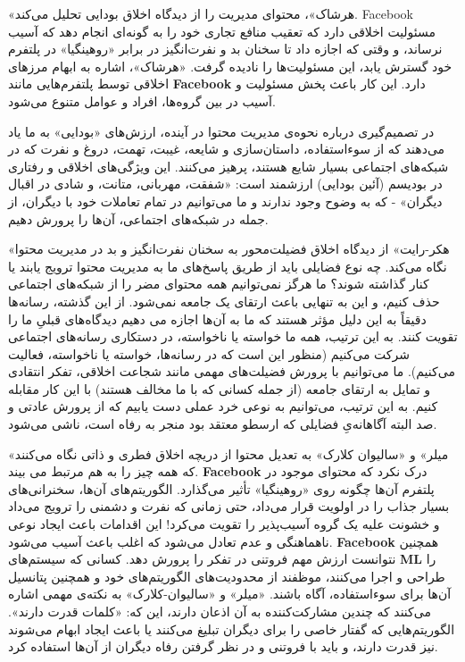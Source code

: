 «هرشاک»، محتوای مدیریت را از دیدگاه اخلاق بودایی تحلیل می‌کند.
Facebook مسئولیت اخلاقی دارد که تعقیب منافع تجاری خود را به گونه‌ای انجام دهد که آسیب نرساند، و وقتی که اجازه داد تا سخنان بد و نفرت‌انگیز در برابر «روهینگیا» در پلتفرم خود گسترش یابد، این مسئولیت‌ها را نادیده گرفت.
«هرشاک»، اشاره به ابهام مرزهای اخلاقی توسط پلتفرم‌هایی مانند \textenglish{\textbf{Facebook}} دارد.
این کار باعث پخش مسئولیت و آسیب در بین گروه‌ها، افراد و عوامل متنوع می‌شود.

در تصمیم‌گیری درباره نحوه‌ی مدیریت محتوا در آینده، ارزش‌های «بودایی» به ما یاد می‌دهند که از سوءاستفاده، داستان‌سازی و شایعه، غیبت، تهمت، دروغ و نفرت که در شبکه‌های اجتماعی بسیار شایع هستند، پرهیز می‌کنند.
این ویژگی‌های اخلاقی و رفتاری در بودیسم (آئین بودایی) ارزشمند است: «شفقت، مهربانی، متانت، و شادی در اقبال دیگران» - که به وضوح وجود ندارند و ما می‌توانیم در تمام تعاملات خود با دیگران، از جمله در شبکه‌های اجتماعی، آن‌ها را پرورش دهیم.

«هکر-رایت» از دیدگاه اخلاق فضیلت‌محور به سخنان نفرت‌انگیز و بد در مدیریت محتوا نگاه می‌کند.
چه نوع فضایلی باید از طریق پاسخ‌های ما به مدیریت محتوا ترویج یابند یا کنار گذاشته شوند؟ ما هرگز نمی‌توانیم همه محتوای مضر را از شبکه‌های اجتماعی حذف کنیم، و این به تنهایی باعث ارتقای یک جامعه نمی‌شود.
از این گذشته، رسانه‌ها دقیقاً به این دلیل مؤثر هستند که ما به آن‌ها اجازه می دهیم دیدگاه‌های قبلیِ ما را تقویت کنند.
به این ترتیب، همه ما خواسته یا ناخواسته، در دستکاری رسانه‌های اجتماعی شرکت می‌کنیم (منظور این است که در رسانه‌ها، خواسته یا ناخواسته، فعالیت می‌کنیم).
ما می‌توانیم با پرورش فضیلت‌های مهمی مانند شجاعت اخلاقی، تفکر انتقادی و تمایل به ارتقای جامعه (از جمله کسانی که با ما مخالف هستند) با این کار مقابله کنیم.
به این ترتیب، می‌توانیم به نوعی خرد عملی دست یابیم که از پرورش عادتی و صد البته آگاهانه‌یِ فضایلی که ارسطو معتقد بود منجر به رفاه است، ناشی می‌شود.

«میلر» و «سالیوان کلارک» به تعدیل محتوا از دریچه اخلاق فطری و ذاتی نگاه می‌کنند که همه چیز را به هم مرتبط می بیند.
\textenglish{\textbf{Facebook}} درک نکرد که محتوای موجود در پلتفرم آن‌ها چگونه روی «روهینگیا» تأثیر می‌گذارد.
الگوریتم‌های آن‌ها، سخنرانی‌های بسیار جذاب را در اولویت قرار می‌داد، حتی زمانی که نفرت و دشمنی را ترویج می‌داد و خشونت علیه یک گروه آسیب‌پذیر را تقویت می‌کرد!
این اقدامات باعث ایجاد نوعی ناهماهنگی و عدم تعادل می‌شود که اغلب باعث آسیب می‌شود.
\textenglish{\textbf{Facebook}} همچنین نتوانست ارزش مهم فروتنی در تفکر را پرورش دهد.
کسانی که سیستم‌های \textenglish{\textbf{ML}} را طراحی و اجرا می‌کنند، موظفند از محدودیت‌های الگوریتم‌های خود و همچنین پتانسیل آن‌ها برای سوءاستفاده، آگاه باشند.
«میلر» و «سالیوان-کلارک» به نکته‌ی مهمی اشاره می‌کنند که چندین مشارکت‌کننده به آن اذعان دارند، این که: «کلمات قدرت دارند».
الگوریتم‌هایی که گفتار خاصی را برای دیگران تبلیغ می‌کنند یا باعث ایجاد ابهام می‌شوند نیز قدرت دارند، و باید با فروتنی و در نظر گرفتن رفاه دیگران از آن‌ها استفاده کرد.

